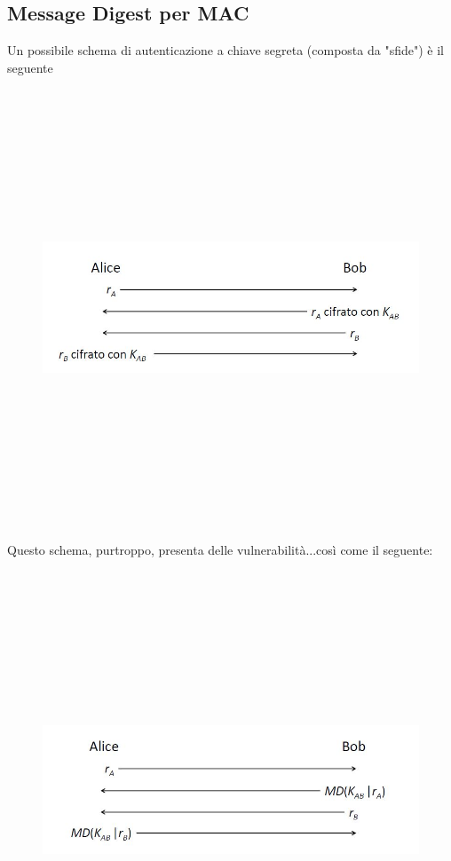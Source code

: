 \subsection{Message Digest per MAC}
Un possibile schema di autenticazione a chiave segreta (composta da "sfide") è il seguente
\begin{figure}
	\begin{center}
	{\includegraphics[height=13cm, width=13cm, keepaspectratio]{Immagini/hash/schema_autenticazione.JPG}}
	\end{center}
\end{figure}
Questo schema, purtroppo, presenta delle vulnerabilità...così come il seguente:
\begin{figure}
	\begin{center}
	{\includegraphics[height=13cm, width=13cm, keepaspectratio]{Immagini/hash/schema_autenticazione_md.JPG}}
	\end{center}
\end{figure}
